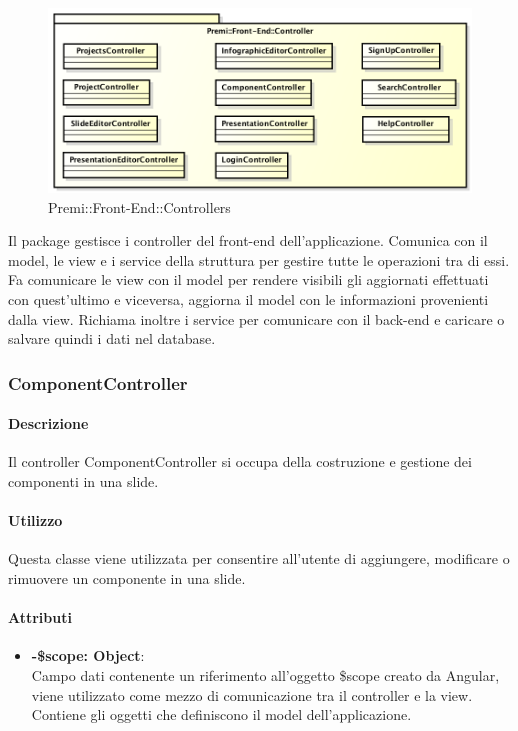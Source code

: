 \begin{figure}[h]
	\centering
	\includegraphics[width=0.7\linewidth]{img/premi_front_end_controllers}
	\caption[Premi::Front-End::Controllers]{Premi::Front-End::Controllers}
\end{figure}
Il package gestisce i controller del front-end dell'applicazione. Comunica con il model, le view e i service della struttura per gestire tutte le operazioni tra di essi. Fa comunicare le view con il model per rendere visibili gli aggiornati effettuati con quest'ultimo e viceversa, aggiorna il model con le informazioni provenienti dalla view. Richiama inoltre i service per comunicare con il back-end e caricare o salvare quindi i dati nel database.
\newpage

\subsubsection{ComponentController}
      \paragraph{Descrizione}
	Il controller ComponentController si occupa della costruzione e gestione dei componenti in una slide.
	
	\paragraph{Utilizzo}
	Questa classe viene utilizzata per consentire all'utente di aggiungere, modificare o rimuovere un componente in una slide.
	
	\paragraph{Attributi}
	\begin{itemize}
		\item \textbf{-\$scope: Object}:\\
				Campo dati contenente un riferimento all'oggetto \$scope creato da Angular, viene utilizzato come mezzo di comunicazione tra il controller e la view. Contiene gli oggetti che definiscono il model dell'applicazione.
	\end{itemize}
	
